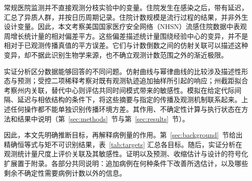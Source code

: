 常规医院监测并不直接观测分枝实验中的变量。住院发生在感染之后，带有延迟，汇总了异质人群，并按日历周期记录。住院计数规模是流行过程的结果，并非外生设计变量。因此，本文考察美国国家医疗安全网络（NHSN）流感住院数据中表观周增长统计量的相对偏差平方\citep{cdc2026nhsn, frutos2025evaluation}。这些偏差描述统计量围绕经验中心的变异，并不是相对于已观测传播真值的平方误差。它们与计数倒数之间的仿射关联可以描述这种变异，却不据此识别生物学来源，也不确立观测计数范围之外的渐近极限。

实证分析区分数据能够回答的不同问题。仿射曲线与幂律曲线的比较涉及描述性形态与预测；受控二项稀释考察对既有观测轨迹追加抽样所引起的响应；州截距拟合考察州内关联，替代中心则评估共同时间模式带来的敏感性。模拟在给定代际间隔、延迟与相依结构的条件下，将这些摘要与指定的传播及观测机制联系起来。上述任何操作都不能单独识别传播环境方差。其作用、不确定性计算与执行状态在方法和结果中说明（第~\ref{sec:methods}~节与第~\ref{sec:results}~节）。

因此，本文先明确推断目标，再解释病例量的作用。第~\ref{sec:background}~节给出精确恒等式与矩不可识别结果，表~\ref{tab:targets} 汇总各目标。随后，实证分析在观测统计量尺度上评价关联及其敏感性。证明以及预测、收缩估计与设计的符号化扩展置于附录。各部分共同说明：追加病例在何种条件下改善所选估计，以及哪些剩余不确定性需要病例计数以外的信息。
